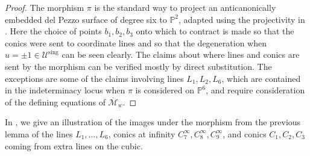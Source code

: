 \documentclass[a4paper,reqno]{amsart}
\numberwithin{equation}{section}
\newcommand{\p}{\mathbb{P}}
\numberwithin{equation}{section}
\begin{document}
\begin{proof}

The morphism $\pi$ is the standard way to project an anticanonically embedded del Pezzo surface of degree six to $\p^2$, adapted using the projectivity in .
Here the choice of points $b_1,b_2,b_3$ onto which to contract is made so that the conics were sent to coordinate lines and so that the degeneration when $u=\pm1\in\mathscr{U}^{\operatorname{sing}}$ can be seen clearly.
The claims about where lines and conics are sent by the  morphism can be verified mostly by direct substitution.
The exceptions are some of the claims involving lines $L_1,L_2,L_6$, which are contained in the indeterminacy locus when $\pi$ is considered on $\p^6$, and require consideration of the defining equations of $\overline{\mathcal{M}}_w$. 
\end{proof}

In , we give an illustration of the images under the morphism from the previous lemma of the lines $L_1,\dots,L_6$, conics at infinity $C_7^{\infty},C_8^{\infty},C_9^{\infty}$, and conics $C_1,C_2,C_3$ coming from extra lines on the cubic.
\end{document}
